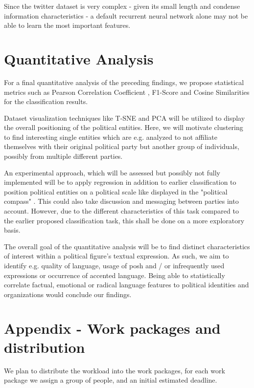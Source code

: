 \documentclass[10pt, oneside]{article}
\begin{document}
\begin{multicols}{2}
Since the twitter dataset is very complex - given its small length and condense information characteristics - a default recurrent neural network alone may not be able to learn the most important features.


\section{Quantitative Analysis}

For a final quantitative analysis of the preceding findings, we propose statistical metrics such as Pearson Correlation Coefficient \cite{Hauke2011}, F1-Score and Cosine Similarities for the classification results.

Dataset visualization techniques like T-SNE \cite{Laurens2008} and PCA \cite{Richardson2009} will be utilized to display the overall positioning of the political entities.
Here, we will motivate clustering to find interesting single entities which are e.g. analyzed to not affiliate themselves with their original political party but another group of individuals, possibly from multiple different parties.

An experimental approach, which will be assessed but possibly not fully implemented will be to apply regression in addition to earlier classification to position political entities on a political scale like displayed in the "political compass" \cite{PoliticalCompass2017}. This could also take discussion and messaging between parties into account.
However, due to the different characteristics of this task compared to the earlier proposed classification task, this shall be done on a more exploratory basis. 

The overall goal of the quantitative analysis will be to find distinct characteristics of interest within a political figure's textual expression. As such, we aim to identify e.g. quality of language, usage of posh and / or infrequently used expressions or occurrence of accented language.
Being able to statistically correlate factual, emotional or radical language features to political identities and organizations would conclude our findings.


\end{multicols}
\newpage

\section{Appendix - Work packages and distribution}

We plan to distribute the workload into the work packages, for each work package we assign a group of people, and an initial estimated deadline.
\end{document}
